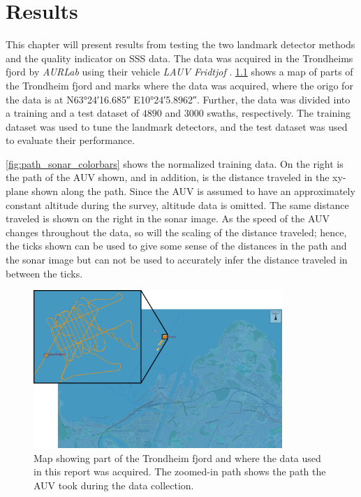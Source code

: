 \chapter{Results}

This chapter will present results from testing the two landmark detector methods and the quality indicator on SSS data. The data was acquired in the Trondheims fjord by \textit{AURLab} using their vehicle \textit{LAUV Fridtjof} \cite{LAUVNTNU}. \cref{fig:neptus_screenshot} shows a map of parts of the Trondheim fjord and marks where the data was acquired, where the origo for the data is at N\ang{63;24;16.685} E\ang{10;24;5.8962}. Further, the data was divided into a training and a test dataset of $4890$ and $3000$ swaths, respectively. The training dataset was used to tune the landmark detectors, and the test dataset was used to evaluate their performance. 

\cref{fig:path_sonar_colorbars} shows the normalized training data. On the right is the path of the AUV shown, and in addition, is the distance traveled in the xy-plane shown along the path. Since the AUV is assumed to have an approximately constant altitude during the survey, altitude data is omitted. The same distance traveled is shown on the right in the sonar image. As the speed of the AUV changes throughout the data, so will the scaling of the distance traveled; hence, the ticks shown can be used to give some sense of the distances in the path and the sonar image but can not be used to accurately infer the distance traveled in between the ticks. 

\begin{figure} [h!]%
  \centering
  \includegraphics[width=0.84\textwidth]{figures/hercules_data.png}
  \caption{Map showing part of the Trondheim fjord and where the data used in this report was acquired. The zoomed-in path shows the path the AUV took during the data collection. }
  \label{fig:neptus_screenshot}
\end{figure}

